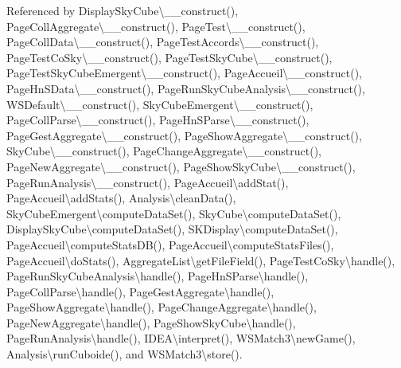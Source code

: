 Referenced by Display\+Sky\+Cube\textbackslash{}\+\_\+\+\_\+construct(), Page\+Coll\+Aggregate\textbackslash{}\+\_\+\+\_\+construct(), Page\+Test\textbackslash{}\+\_\+\+\_\+construct(), Page\+Coll\+Data\textbackslash{}\+\_\+\+\_\+construct(), Page\+Test\+Accords\textbackslash{}\+\_\+\+\_\+construct(), Page\+Test\+Co\+Sky\textbackslash{}\+\_\+\+\_\+construct(), Page\+Test\+Sky\+Cube\textbackslash{}\+\_\+\+\_\+construct(), Page\+Test\+Sky\+Cube\+Emergent\textbackslash{}\+\_\+\+\_\+construct(), Page\+Accueil\textbackslash{}\+\_\+\+\_\+construct(), Page\+Hn\+S\+Data\textbackslash{}\+\_\+\+\_\+construct(), Page\+Run\+Sky\+Cube\+Analysis\textbackslash{}\+\_\+\+\_\+construct(), W\+S\+Default\textbackslash{}\+\_\+\+\_\+construct(), Sky\+Cube\+Emergent\textbackslash{}\+\_\+\+\_\+construct(), Page\+Coll\+Parse\textbackslash{}\+\_\+\+\_\+construct(), Page\+Hn\+S\+Parse\textbackslash{}\+\_\+\+\_\+construct(), Page\+Gest\+Aggregate\textbackslash{}\+\_\+\+\_\+construct(), Page\+Show\+Aggregate\textbackslash{}\+\_\+\+\_\+construct(), Sky\+Cube\textbackslash{}\+\_\+\+\_\+construct(), Page\+Change\+Aggregate\textbackslash{}\+\_\+\+\_\+construct(), Page\+New\+Aggregate\textbackslash{}\+\_\+\+\_\+construct(), Page\+Show\+Sky\+Cube\textbackslash{}\+\_\+\+\_\+construct(), Page\+Run\+Analysis\textbackslash{}\+\_\+\+\_\+construct(), Page\+Accueil\textbackslash{}add\+Stat(), Page\+Accueil\textbackslash{}add\+Stats(), Analysis\textbackslash{}clean\+Data(), Sky\+Cube\+Emergent\textbackslash{}compute\+Data\+Set(), Sky\+Cube\textbackslash{}compute\+Data\+Set(), Display\+Sky\+Cube\textbackslash{}compute\+Data\+Set(), S\+K\+Display\textbackslash{}compute\+Data\+Set(), Page\+Accueil\textbackslash{}compute\+Stats\+D\+B(), Page\+Accueil\textbackslash{}compute\+Stats\+Files(), Page\+Accueil\textbackslash{}do\+Stats(), Aggregate\+List\textbackslash{}get\+File\+Field(), Page\+Test\+Co\+Sky\textbackslash{}handle(), Page\+Run\+Sky\+Cube\+Analysis\textbackslash{}handle(), Page\+Hn\+S\+Parse\textbackslash{}handle(), Page\+Coll\+Parse\textbackslash{}handle(), Page\+Gest\+Aggregate\textbackslash{}handle(), Page\+Show\+Aggregate\textbackslash{}handle(), Page\+Change\+Aggregate\textbackslash{}handle(), Page\+New\+Aggregate\textbackslash{}handle(), Page\+Show\+Sky\+Cube\textbackslash{}handle(), Page\+Run\+Analysis\textbackslash{}handle(), I\+D\+E\+A\textbackslash{}interpret(), W\+S\+Match3\textbackslash{}new\+Game(), Analysis\textbackslash{}run\+Cuboide(), and W\+S\+Match3\textbackslash{}store().

\mbox{\label{process_hn_s_8php_a3b839490e7b9164c1775d247a18fe335}} 
